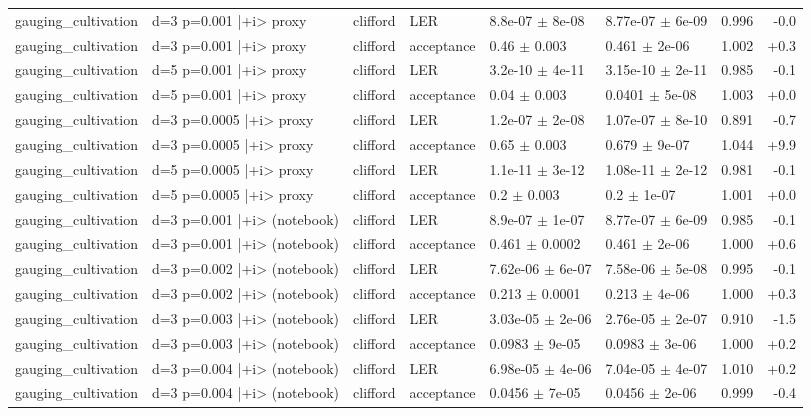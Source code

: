 \documentclass[10pt]{article}
\begin{document}
{\begin{longtable}{l l l l l l r r}
gauging\_cultivation & d=3 p=0.001 |+i> proxy & clifford & LER & 8.8e-07 $\pm$ 8e-08 & 8.77e-07 $\pm$ 6e-09 & 0.996 & -0.0 \\
gauging\_cultivation & d=3 p=0.001 |+i> proxy & clifford & acceptance & 0.46 $\pm$ 0.003 & 0.461 $\pm$ 2e-06 & 1.002 & +0.3 \\
gauging\_cultivation & d=5 p=0.001 |+i> proxy & clifford & LER & 3.2e-10 $\pm$ 4e-11 & 3.15e-10 $\pm$ 2e-11 & 0.985 & -0.1 \\
gauging\_cultivation & d=5 p=0.001 |+i> proxy & clifford & acceptance & 0.04 $\pm$ 0.003 & 0.0401 $\pm$ 5e-08 & 1.003 & +0.0 \\
gauging\_cultivation & d=3 p=0.0005 |+i> proxy & clifford & LER & 1.2e-07 $\pm$ 2e-08 & 1.07e-07 $\pm$ 8e-10 & 0.891 & -0.7 \\
gauging\_cultivation & d=3 p=0.0005 |+i> proxy & clifford & acceptance & 0.65 $\pm$ 0.003 & 0.679 $\pm$ 9e-07 & 1.044 & +9.9 \\
gauging\_cultivation & d=5 p=0.0005 |+i> proxy & clifford & LER & 1.1e-11 $\pm$ 3e-12 & 1.08e-11 $\pm$ 2e-12 & 0.981 & -0.1 \\
gauging\_cultivation & d=5 p=0.0005 |+i> proxy & clifford & acceptance & 0.2 $\pm$ 0.003 & 0.2 $\pm$ 1e-07 & 1.001 & +0.0 \\
gauging\_cultivation & d=3 p=0.001 |+i> (notebook) & clifford & LER & 8.9e-07 $\pm$ 1e-07 & 8.77e-07 $\pm$ 6e-09 & 0.985 & -0.1 \\
gauging\_cultivation & d=3 p=0.001 |+i> (notebook) & clifford & acceptance & 0.461 $\pm$ 0.0002 & 0.461 $\pm$ 2e-06 & 1.000 & +0.6 \\
gauging\_cultivation & d=3 p=0.002 |+i> (notebook) & clifford & LER & 7.62e-06 $\pm$ 6e-07 & 7.58e-06 $\pm$ 5e-08 & 0.995 & -0.1 \\
gauging\_cultivation & d=3 p=0.002 |+i> (notebook) & clifford & acceptance & 0.213 $\pm$ 0.0001 & 0.213 $\pm$ 4e-06 & 1.000 & +0.3 \\
gauging\_cultivation & d=3 p=0.003 |+i> (notebook) & clifford & LER & 3.03e-05 $\pm$ 2e-06 & 2.76e-05 $\pm$ 2e-07 & 0.910 & -1.5 \\
gauging\_cultivation & d=3 p=0.003 |+i> (notebook) & clifford & acceptance & 0.0983 $\pm$ 9e-05 & 0.0983 $\pm$ 3e-06 & 1.000 & +0.2 \\
gauging\_cultivation & d=3 p=0.004 |+i> (notebook) & clifford & LER & 6.98e-05 $\pm$ 4e-06 & 7.04e-05 $\pm$ 4e-07 & 1.010 & +0.2 \\
gauging\_cultivation & d=3 p=0.004 |+i> (notebook) & clifford & acceptance & 0.0456 $\pm$ 7e-05 & 0.0456 $\pm$ 2e-06 & 0.999 & -0.4 \\

\end{longtable}}
\end{document}
